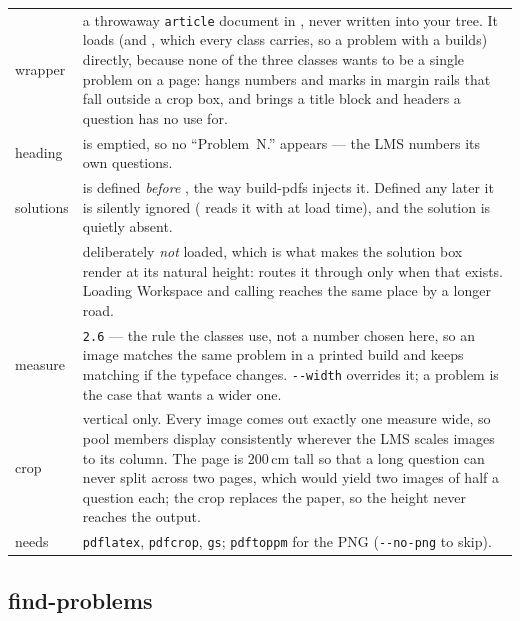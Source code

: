 \begin{center}
\begin{tabularx}{\linewidth}{@{}l Y@{}}
wrapper & a throwaway \texttt{article} document in , never
  written into your tree. It loads  (and ,
  which every class carries, so a problem with a  builds) directly, because none
  of the three classes wants to be a single problem on a page: 
  hangs numbers and marks in margin rails that fall outside a crop box, and
   brings a title block and headers a question has no use
  for.\\
heading &  is emptied, so no ``Problem~N.'' appears
  --- the LMS numbers its own questions.\\
solutions &  is defined \emph{before} , the
  way build-pdfs injects it. Defined any later it is silently ignored
  ( reads it with  at load time), and the
  solution is quietly absent.\\
 & deliberately \emph{not} loaded, which is what makes the
  solution box render at its natural height:  routes it through
   only when that exists. Loading Workspace and calling
   reaches the same place by a longer road.\\
measure & \texttt{2.6} --- the rule the classes use, not a number
  chosen here, so an image matches the same problem in a printed build and keeps
  matching if the typeface changes. \texttt{-{}-width} overrides it; a
   problem is the case that wants a wider one.\\
crop & vertical only. Every image comes out exactly one measure wide, so pool
  members display consistently wherever the LMS scales images to its column. The
  page is 200\,cm tall so that a long question can never split across two pages,
  which would yield two images of half a question each; the crop replaces the
  paper, so the height never reaches the output.\\
needs & \texttt{pdflatex}, \texttt{pdfcrop}, \texttt{gs}; \texttt{pdftoppm} for
  the PNG (\texttt{-{}-no-png} to skip).\\
\end{tabularx}
\end{center}

\subsection*{find-problems}

